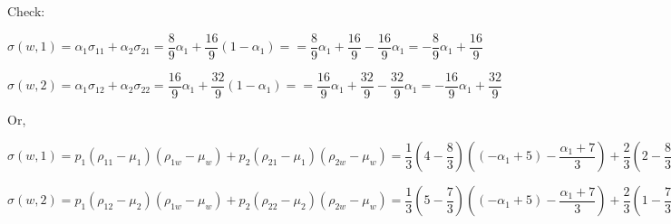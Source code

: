 \documentclass{article}
\begin{document}
Check:

$\sigma\left(w,1\right)=\alpha_{1}\sigma_{11}+\alpha_{2}\sigma_{21}=\dfrac{8}{9}\alpha_{1}+\dfrac{16}{9}\left(1-\alpha_{1}\right)==\dfrac{8}{9}\alpha_{1}+\dfrac{16}{9}-\dfrac{16}{9}\alpha_{1}=-\dfrac{8}{9}\alpha_{1}+\dfrac{16}{9}$

$\sigma\left(w,2\right)=\alpha_{1}\sigma_{12}+\alpha_{2}\sigma_{22}=\dfrac{16}{9}\alpha_{1}+\dfrac{32}{9}\left(1-\alpha_{1}\right)==\dfrac{16}{9}\alpha_{1}+\dfrac{32}{9}-\dfrac{32}{9}\alpha_{1}=-\dfrac{16}{9}\alpha_{1}+\dfrac{32}{9}$

Or,

$\sigma\left(w,1\right)=p_{1}\left(\rho_{11}-\mu_{1}\right)\left(\rho_{1w}-\mu_{w}\right)+p_{2}\left(\rho_{21}-\mu_{1}\right)\left(\rho_{2w}-\mu_{w}\right)=\dfrac{1}{3}\left(4-\dfrac{8}{3}\right)\left(\left(-\alpha_{1}+5\right)-\dfrac{\alpha_{1}+7}{3}\right)+\dfrac{2}{3}\left(2-\dfrac{8}{3}\right)\left(\left(\alpha_{1}+1\right)-\dfrac{\alpha_{1}+7}{3}\right)=\dfrac{1}{3}\cdot\left(\dfrac{12}{3}-\dfrac{8}{3}\right)\left(\dfrac{-3\alpha_{1}+15-\alpha_{1}-7}{3}\right)+\dfrac{2}{3}\cdot\left(\dfrac{6}{3}-\dfrac{8}{3}\right)\left(\dfrac{3\alpha_{1}+3-\alpha_{1}-7}{3}\right)=\dfrac{1}{3}\cdot\dfrac{4}{3}\cdot\dfrac{-4\alpha_{1}+8}{3}+\dfrac{2}{3}\cdot\dfrac{-2}{3}\cdot\dfrac{2\alpha_{1}-4}{3}=\dfrac{4}{27}\left[\left(-4\alpha_{1}+8\right)-\left(2\alpha_{1}-4\right)\right]=\dfrac{4}{27}\left(-4\alpha_{1}+8-2\alpha_{1}+4\right)=\dfrac{4}{27}\left(-6\alpha_{1}+12\right)=\dfrac{4}{27}\cdot6\left(-\alpha_{1}+2\right)=\dfrac{4}{3\cdot9}\cdot3\cdot2\left(-\alpha_{1}+2\right)=-\dfrac{8}{9}\alpha_{1}+\dfrac{16}{9}$

$\sigma\left(w,2\right)=p_{1}\left(\rho_{12}-\mu_{2}\right)\left(\rho_{1w}-\mu_{w}\right)+p_{2}\left(\rho_{22}-\mu_{2}\right)\left(\rho_{2w}-\mu_{w}\right)=\dfrac{1}{3}\left(5-\dfrac{7}{3}\right)\left(\left(-\alpha_{1}+5\right)-\dfrac{\alpha_{1}+7}{3}\right)+\dfrac{2}{3}\left(1-\dfrac{7}{3}\right)\left(\left(\alpha_{1}+1\right)-\dfrac{\alpha_{1}+7}{3}\right)=\dfrac{1}{3}\cdot\left(\dfrac{15}{3}-\dfrac{7}{3}\right)\left(\dfrac{-3\alpha_{1}+15-\alpha_{1}-7}{3}\right)+\dfrac{2}{3}\cdot\left(\dfrac{3}{3}-\dfrac{7}{3}\right)\left(\dfrac{3\alpha_{1}+3-\alpha_{1}-7}{3}\right)=\dfrac{1}{3}\cdot\dfrac{4}{3}\cdot\dfrac{-4\alpha_{1}+8}{3}+\dfrac{2}{3}\cdot\dfrac{-2}{3}\cdot\dfrac{2\alpha_{1}-4}{3}=\dfrac{4}{27}\left[\left(-4\alpha_{1}+8\right)-\left(2\alpha_{1}-4\right)\right]=\dfrac{4}{27}\left(-4\alpha_{1}+8-2\alpha_{1}+4\right)=\dfrac{4}{27}\left(-6\alpha_{1}+12\right)=\dfrac{4}{27}\cdot6\left(-\alpha_{1}+2\right)=\dfrac{4}{3\cdot9}\cdot3\cdot2\left(-\alpha_{1}+2\right)=-\dfrac{8}{9}\alpha_{1}+\dfrac{16}{9}$
\end{document}
